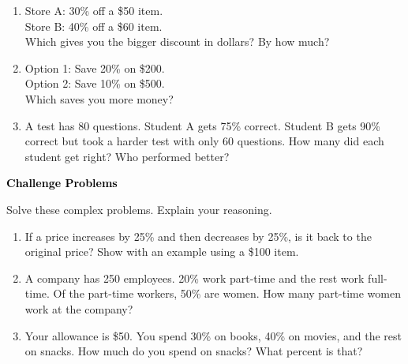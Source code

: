 \documentclass[12pt, letterpaper, fleqn]{article}
\begin{document}
\begin{enumerate}[itemsep=2cm, leftmargin=0.6cm]

\item Store A: 30\% off a \$50 item.\\
Store B: 40\% off a \$60 item.\\
Which gives you the bigger discount in dollars? By how much?

\vspace{2.3cm}

\item Option 1: Save 20\% on \$200.\\
Option 2: Save 10\% on \$500.\\
Which saves you more money?

\vspace{2.3cm}

\item A test has 80 questions. Student A gets 75\% correct. Student B gets 90\% correct but took a harder test with only 60 questions. How many did each student get right? Who performed better?

\vspace{2.5cm}

\end{enumerate}

\newpage

\begin{tcolorbox}[colback=customteal!20]
\large\textcolor{black}{\textbf{Challenge Problems}}
\end{tcolorbox}

\noindent
Solve these complex problems. Explain your reasoning.

\vspace{3mm}

\begin{enumerate}[itemsep=2.3cm, leftmargin=0.6cm]

\item If a price increases by 25\% and then decreases by 25\%, is it back to the original price? Show with an example using a \$100 item.

\vspace{2.5cm}

\item A company has 250 employees. 20\% work part-time and the rest work full-time. Of the part-time workers, 50\% are women. How many part-time women work at the company?

\vspace{2.5cm}

\item Your allowance is \$50. You spend 30\% on books, 40\% on movies, and the rest on snacks. How much do you spend on snacks? What percent is that?

\vspace{2.5cm}

\end{enumerate}
\end{document}
